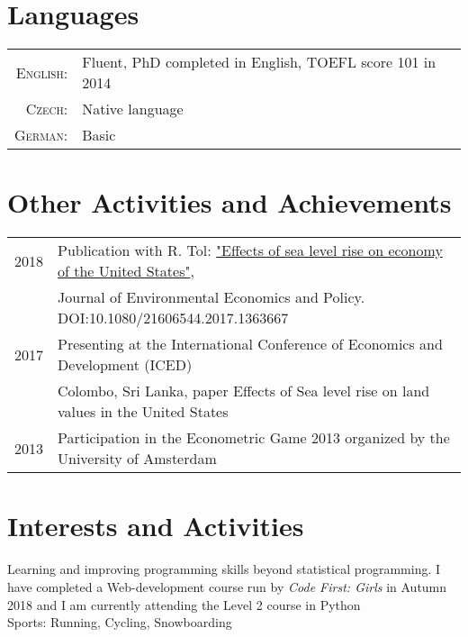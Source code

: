 \documentclass[a4paper,10pt]{article}
\begin{document}
\section{Languages}
\begin{tabular}{rl}
\textsc{English:}&Fluent, PhD completed in English, TOEFL score 101 in 2014\\
\textsc{Czech:}&Native language\\
\textsc{German:}&Basic\\
\end{tabular}


\section{Other Activities and Achievements}
\begin{tabular}{rl}
2018 & Publication with R. Tol:  \href{https://www.tandfonline.com/doi/full/10.1080/21606544.2017.1363667}{"Effects of sea level rise on economy of the United States"},\\
  &Journal of Environmental Economics and Policy. DOI:10.1080/21606544.2017.1363667\normalsize\\
 2017 & Presenting at the International Conference of Economics and Development (ICED)\normalsize\\
 &  Colombo, Sri Lanka, paper Effects of Sea level rise on land values in the United States\normalsize\\
 2013 & Participation in the Econometric Game 2013 organized by the University of Amsterdam
\end{tabular}

\section{Interests and Activities}
Learning and improving programming skills beyond statistical programming. I have completed a  Web-development course run by \textit{Code First: Girls} in Autumn 2018 and I am currently attending the Level 2 course in Python
\vspace{0.15cm} \\
Sports: Running, Cycling, Snowboarding
\vspace{0.15cm}

\end{document}
